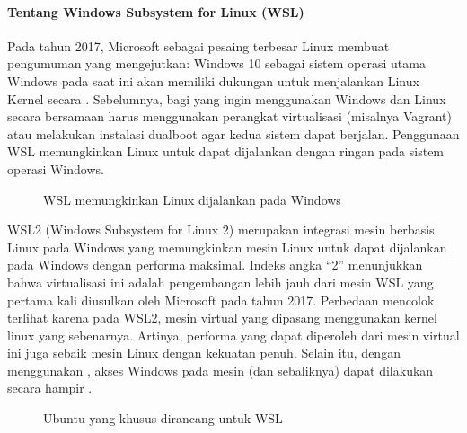 \documentclass[letterpaper,10pt,english]{sphinxmanual}
\begin{document}
\paragraph{Tentang Windows Subsystem for Linux (WSL)}
\label{\detokenize{sesi1/pengantarlinux:tentang-windows-subsystem-for-linux-wsl}}
Pada tahun 2017, Microsoft sebagai pesaing terbesar Linux membuat pengumuman yang mengejutkan: Windows 10 sebagai sistem operasi utama Windows pada saat ini akan memiliki dukungan untuk menjalankan Linux Kernel secara . Sebelumnya, bagi  yang ingin menggunakan Windows dan Linux secara bersamaan harus menggunakan perangkat virtualisasi (misalnya Vagrant) atau melakukan instalasi dual\sphinxhyphen{}boot agar kedua sistem dapat berjalan. Penggunaan WSL memungkinkan Linux untuk dapat dijalankan dengan ringan pada sistem operasi Windows.

\begin{figure}[htbp]
\centering
\capstart

\noindent{}
\caption{WSL memungkinkan Linux dijalankan pada Windows}\label{\detokenize{sesi1/pengantarlinux:wsl}}\end{figure}

WSL2 (Windows Subsystem for Linux 2) merupakan integrasi mesin berbasis Linux pada Windows yang memungkinkan mesin Linux untuk dapat dijalankan pada Windows dengan performa maksimal. Indeks angka “2” menunjukkan bahwa virtualisasi ini adalah pengembangan lebih jauh dari mesin WSL yang pertama kali diusulkan oleh Microsoft pada tahun 2017. Perbedaan mencolok terlihat karena pada WSL2, mesin virtual yang dipasang menggunakan kernel linux yang sebenarnya. Artinya, performa yang dapat diperoleh dari mesin virtual ini juga sebaik mesin Linux dengan kekuatan penuh. Selain itu, dengan menggunakan , akses Windows pada mesin (dan sebaliknya) dapat dilakukan secara hampir .

\begin{figure}[htbp]
\centering
\capstart

\noindent{}
\caption{Ubuntu yang khusus dirancang untuk WSL}\label{\detokenize{sesi1/pengantarlinux:wsl2}}\end{figure}
\end{document}
